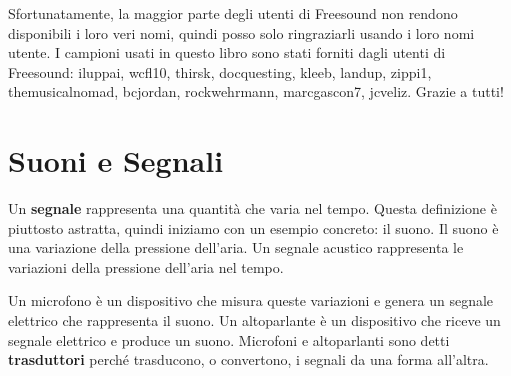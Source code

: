 \documentclass[12pt]{book} \usepackage[width=5.5in,height=8.5in, hmarginratio=3:2,vmarginratio=1:1]{geometry}
\begin{document}
Sfortunatamente, la maggior parte degli utenti di Freesound non rendono disponibili i loro veri nomi, quindi posso solo ringraziarli usando i loro nomi utente. I campioni usati in questo libro sono stati forniti dagli utenti di Freesound: iluppai, wcfl10, thirsk, docquesting, kleeb, landup, zippi1, themusicalnomad, bcjordan, rockwehrmann, marcgascon7, jcveliz. Grazie a tutti!

\normalsize

\clearemptydoublepage

\begin{latexonly} 

\tableofcontents

\clearemptydoublepage

\end{latexonly} 

\mainmatter

\chapter{Suoni e Segnali} \label{sounds} 

Un {\bf segnale} rappresenta una quantità che varia nel tempo. Questa definizione è piuttosto astratta, quindi iniziamo con un esempio concreto: il suono. Il suono è una variazione della pressione dell'aria. Un segnale acustico rappresenta le variazioni della pressione dell'aria nel tempo.

Un microfono è un dispositivo che misura queste variazioni e genera un segnale elettrico che rappresenta il suono. Un altoparlante è un dispositivo che riceve un segnale elettrico e produce un suono. Microfoni e altoparlanti sono detti {\bf trasduttori} perché trasducono, o convertono, i segnali da una forma all'altra.
\end{document}
